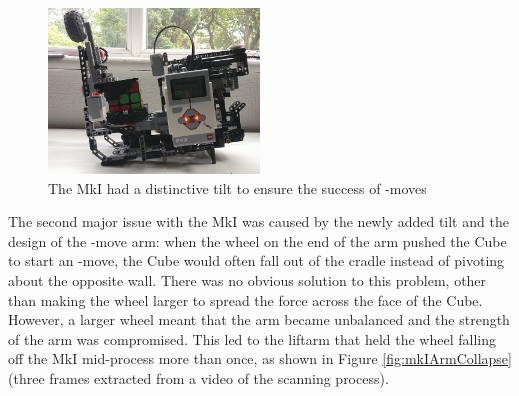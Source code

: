 \documentclass{report}
\newcommand{\move}[1]{\uppercase{\texttt{\formatmovesnospace{#1}}}-move}
\begin{document}
	\begin{figure}[H]
		\begin{center}
			\includegraphics[width=0.5\textwidth]{Resources/Images/imgCubeSolverV1.png}
			\caption{The MkI had a distinctive tilt to ensure the success of \move{x}s}
			\label{fig:imgCubeSolverV1}
		\end{center} 
	\end{figure}

	The second major issue with the MkI was caused by the newly added tilt and the design of the \move{x} arm: when the wheel on the end of the arm pushed the Cube to start an \move{x}, the Cube would often fall out of the cradle instead of pivoting about the opposite wall. There was no obvious solution to this problem, other than making the wheel larger to spread the force across the face of the Cube. However, a larger wheel meant that the arm became unbalanced and the strength of the arm was compromised. This led to the liftarm that held the wheel falling off the MkI mid-process more than once, as shown in Figure \ref{fig:mkIArmCollapse} (three frames extracted from a video of the scanning process).
\end{document}
